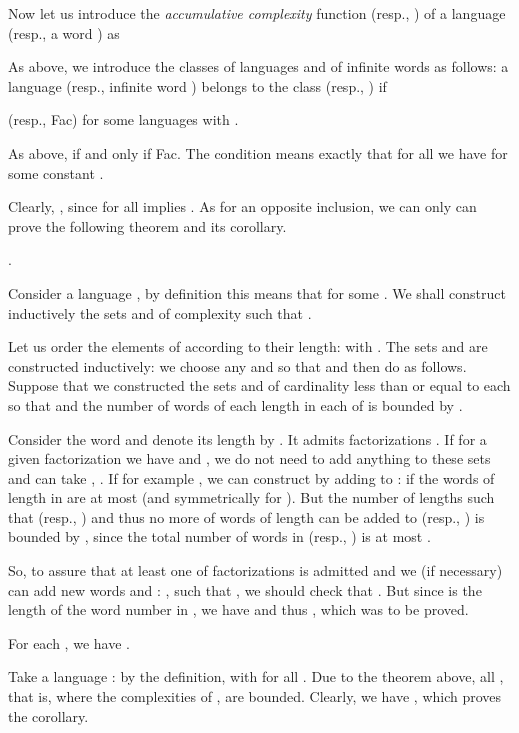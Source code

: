 \documentclass[runningheads,envcountsect,envcountsame]{llncs}
\begin{document}
Now let us introduce the {\it accumulative complexity} function  (resp., ) of a language  (resp., a word )
as

As above, we introduce the classes  of languages
and  of infinite words as follows: a language 
(resp., infinite word ) belongs to the class 
(resp., ) if

(resp., Fac)
for some languages  with .

As above,  if and only if Fac. The condition  means exactly that for all  we have  for some constant .

Clearly, , since  for all  implies . As for an opposite inclusion, we can only can prove the following theorem and its corollary.

\begin{theorem}
 .
\end{theorem}
 Consider a language ,
by definition this means  that  for some . We shall construct inductively the sets  and  of complexity
 such that .

Let us order the elements of  according to their length:
 with . The
sets  and  are constructed inductively: we choose any
 and  so that  and then do
as follows. Suppose that we constructed the sets  and
 of cardinality less than or equal to  each so that
 and the number of
words of each length  in each of   is bounded
by .

 Consider the word  and denote its length by . It admits 
 factorizations . If for a given factorization we have  and ,
 we do not need to add anything to these sets and can take , . If for example , we can construct 
 by adding  to :  if the words of length  in  are at most  (and symmetrically for ).
 But the number  of lengths  such that  (resp., )
 and thus no more of words of length  can be added to  (resp., ) is bounded by ,
 since the total number of words in  (resp., ) is at most .

So, to assure that at least one of  factorizations is
admitted and we (if necessary) can add new words  and :
,  such that
, we should check that . But since  is the length of the word number 
in , we have  and thus , which was to be proved. \hfill 

\begin{corollary}
For each , we have .
\end{corollary}
 Take a language : by the definition,  with  for all . Due to the theorem above, all , that is,  where the complexities of ,  are bounded. Clearly, we have
, which proves the corollary. \hfill 
\end{document}
